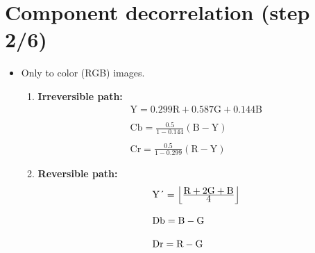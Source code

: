 \section{Component decorrelation (step 2/6)}
\begin{itemize}
\item [] Only to color (RGB) images.
  \begin{enumerate}
  \item \textbf{Irreversible path:}
    \begin{equation}
      \begin{array}{l}
        \text{Y} = 0.299\text{R}+0.587\text{G}+0.144\text{B}\\
        ~\\
        \text{Cb} = \frac{\displaystyle0.5}{\displaystyle1-0.144}(\text{B}-\text{Y})\\
        ~\\
        \text{Cr} = \frac{\displaystyle0.5}{\displaystyle1-0.299}(\text{R}-\text{Y})
      \end{array}
    \end{equation}
  \item \textbf{Reversible path:}
    \begin{equation}
      \begin{array}{l}
        \text{Y\'{}} =
        \Big\lfloor\frac{\displaystyle\text{R}+2\text{G}+\text{B}}{\displaystyle 4}\Big\rfloor\\
         ~\\
       \text{Db} = \text{B}-\text{G}\\
        ~\\
        \text{Dr} = \text{R}-\text{G}
      \end{array}
    \end{equation}
  \end{enumerate}
\end{itemize}


